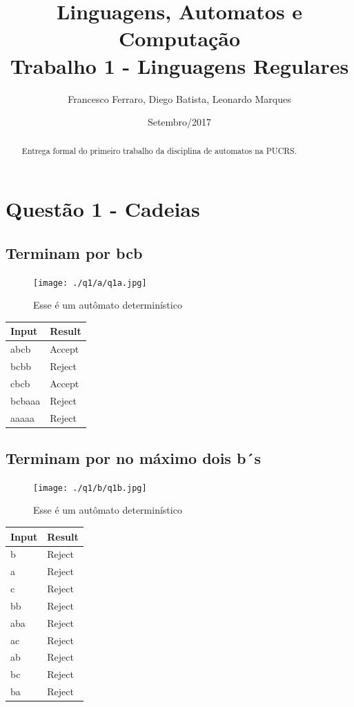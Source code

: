 \documentclass[11pt]{article}
\author{Francesco Ferraro, Diego Batista, Leonardo Marques}
\date{Setembro/2017}
\title{Linguagens, Automatos e Computação\\\medskip
\large Trabalho 1 - Linguagens Regulares}
\begin{document}
\maketitle
\begin{abstract}
Entrega formal do primeiro trabalho da disciplina de automatos na PUCRS.
\end{abstract}

\section{Questão 1 - Cadeias}
\label{sec:orgf266f04}
\subsection{Terminam por bcb}
\label{sec:orge85a861}
\begin{figure}[htbp]
\centering
\texttt{[image: ./q1/a/q1a.jpg]}
\caption{\label{fig:orgad2e5ec}
Esse é um autômato determinístico}
\end{figure}

\begin{center}
\begin{tabular}{ll}
Input & Result\\
\hline
abcb & Accept\\
bcbb & Reject\\
cbcb & Accept\\
bcbaaa & Reject\\
aaaaa & Reject\\
\end{tabular}
\end{center}

\subsection{Terminam por no máximo dois b´s}
\label{sec:org2ac98ea}
\begin{figure}[htbp]
\centering
\texttt{[image: ./q1/b/q1b.jpg]}
\caption{\label{fig:orgc29ce22}
Esse é um autômato determinístico}
\end{figure}

\begin{center}
\begin{tabular}{ll}
Input & Result\\
\hline
b & Reject\\
a & Reject\\
c & Reject\\
bb & Reject\\
aba & Reject\\
ac & Reject\\
ab & Reject\\
bc & Reject\\
ba & Reject\\
\end{tabular}
\end{center}
\end{document}
